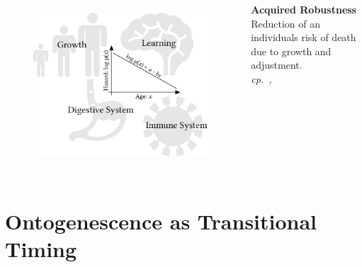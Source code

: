 \documentclass{beamer}
\begin{document}
\begin{frame}
\frametitle{\insertsection}

\begin{columns}[c]

\begin{figure}[htb!]
\includegraphics[width = \textwidth]{./fig/acquired_robustness.pdf}\\
\end{figure}

\footnotesize\textbf{Acquired Robustness}\\
Reduction of an individuals risk of death due to growth and adjustment.\\
\scriptsize\emph{cp.~\textcite{Levitis2011}, \textcite{Siler1979}}

\end{columns}

\end{frame}

\section{Ontogenescence as Transitional Timing} %
\end{document}
